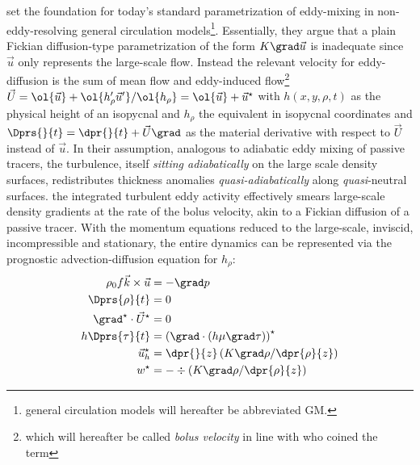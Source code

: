 

\section*{\citealt{gent1990isopycnal,gent1995parameterizing}}\label{sec:hist_gentmcw}
\citeauthor*{gent1990isopycnal} set the foundation for today's standard parametrization of eddy-mixing in non-eddy-resolving general circulation models\footnote{general circulation models will hereafter be abbreviated GM.}.
Essentially, they argue that a plain Fickian diffusion-type parametrization of
the form $K \grad \vec{u}$ is inadequate since $\vec{u}$ only represents the
large-scale flow.
Instead the relevant velocity for eddy-diffusion is the sum of mean flow and eddy-induced flow\footnote{which will hereafter be called \textit{bolus velocity} in line with \cite{rhines1982basic} who coined the term} $\vec{U}=\ol{\vec{u}} + \ol{h'_{\rho} \vec{u}'}/\ol{h_{\rho}} =\ol{\vec{u}} + \vec{u}^{\star}$ with $h(x,y,\rho,t)$ as the physical height of an isopycnal and $h_{\rho}$ the equivalent in isopycnal coordinates and $\Dprs{}{t}= \dpr{}{t} +\vec{U} \grad $ as the material derivative with respect to $\vec{U}$ instead of $\vec{u}$.
In their assumption, analogous to adiabatic eddy mixing of passive tracers, the  turbulence, itself \textit{sitting adiabatically} on the large scale density surfaces, redistributes thickness anomalies \textit{quasi-adiabatically} along \textit{quasi}-neutral surfaces. \Ie the integrated turbulent eddy activity effectively smears large-scale density gradients at the rate of the bolus velocity, akin to a Fickian diffusion of a passive tracer. With the momentum equations reduced to the large-scale, inviscid, incompressible and stationary, the entire dynamics can be represented via the prognostic advection-diffusion equation for $h_{\rho}$: \\
\begin{subequations}\begin{align}
	\rho_0  f \vec{k} \times \vec{u}
	&=
	-\grad p\\
	\Dprs{\rho}{t} %
	&=
	0 \\
	\grad^{\star} \cdot \vec{U}^{\star}
	&=
	0	\\
	 \addtocounter{equation}{+3}
	h \Dprs{\tau}{t}
	&=
	 \left(\grad \cdot \left( h\mu \grad \tau \right) \right)^{\star}	\label{eq:fick_tracer}\\
 \vec{u}_h^{\star} &= \dpr{}{z}\left( K \grad \rho/\dpr{\rho}{z} \right) \\
w^{\star} &=-\div\left( K \grad \rho/\dpr{\rho}{z} \right)
\end{align}\end{subequations}
